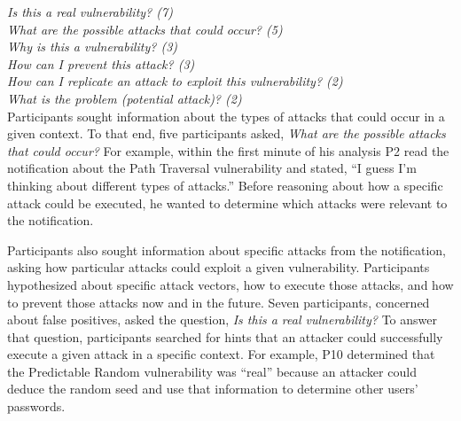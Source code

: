 \documentclass{sig-alternate}
\begin{document}
\noindent\emph{Is this a real vulnerability? (7)} \\
\emph{What are the possible attacks that could occur? (5)} \\
\emph{Why is this a vulnerability? (3)} \\
\emph{How can I prevent this attack? (3)} \\
\emph{How can I replicate an attack to exploit this vulnerability? (2)} \\
\emph{What is the problem (potential attack)? (2)} 
\\

Participants sought information about the types of attacks that could occur in a given context.
To that end, five participants asked, \textit{What are the possible attacks that could occur?}
For example, within the first minute of his analysis P2 read the notification about the Path Traversal vulnerability and stated, ``I guess I'm thinking about different types of attacks.''
Before reasoning about how a specific attack could be executed, he wanted to determine which attacks were relevant to the notification.

Participants also sought information about specific attacks from the notification, asking how particular attacks could exploit a given vulnerability.
Participants hypothesized about specific attack vectors, how to execute those attacks, and how to prevent those attacks now and in the future.
Seven participants, concerned about false positives, asked the question, \textit{Is this a real vulnerability?} 
To answer that question, participants searched for hints that an attacker could successfully execute a given attack in a specific context. 
For example, P10 determined that the Predictable Random vulnerability was ``real'' because an attacker could deduce the random seed and use that information to determine other users' passwords. 


\end{document}
